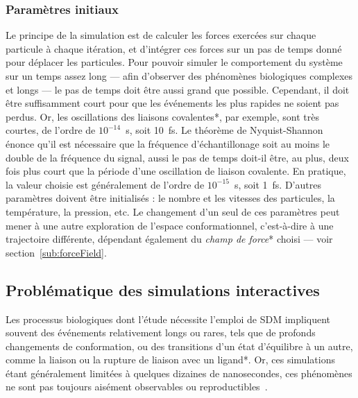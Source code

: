 	\subsubsection{Paramètres initiaux} Le principe de la simulation est de calculer les forces exercées sur chaque particule à chaque itération, et d'intégrer ces forces sur un pas de temps donné pour déplacer les particules. Pour pouvoir simuler le comportement du système sur un temps assez long --- afin d'observer des phénomènes biologiques complexes et longs --- le pas de temps doit être aussi grand que possible. Cependant, il doit être suffisamment court pour que les événements les plus rapides ne soient pas perdus. Or, les oscillations des liaisons covalentes*, par exemple, sont très courtes, de l'ordre de $10^{-14}$~s, soit 10~fs.\footnotemark{} Le théorème de Nyquist-Shannon~\cite{shannon1949communication} énonce qu'il est nécessaire que la fréquence d'échantillonage soit au moins le double de la fréquence du signal, aussi le pas de temps doit-il être, au plus, deux fois plus court que la période d'une oscillation de liaison covalente. En pratique, la valeur choisie est généralement de l'ordre de $10^{-15}$~s, soit 1~fs. D'autres paramètres doivent être initialisés : le nombre et les vitesses des particules, la température, la pression, etc. Le changement d'un seul de ces paramètres peut mener à une autre exploration de l'espace conformationnel, c'est-à-dire à une trajectoire différente, dépendant également du \emph{champ de force}* choisi --- voir section~\ref{sub:forceField}.
	
	
	
	\subsection{Problématique des simulations interactives}
	
	Les processus biologiques dont l'étude nécessite l'emploi de SDM impliquent souvent des événements relativement longs ou rares, tels que de profonds changements de conformation, ou des transitions d'un état d'équilibre à un autre, comme la liaison ou la rupture de liaison avec un ligand*. Or, ces simulations étant généralement limitées à quelques dizaines de nanosecondes, ces phénomènes ne sont pas toujours aisément observables ou reproductibles~\cite{phillips2005scalable}.
	
